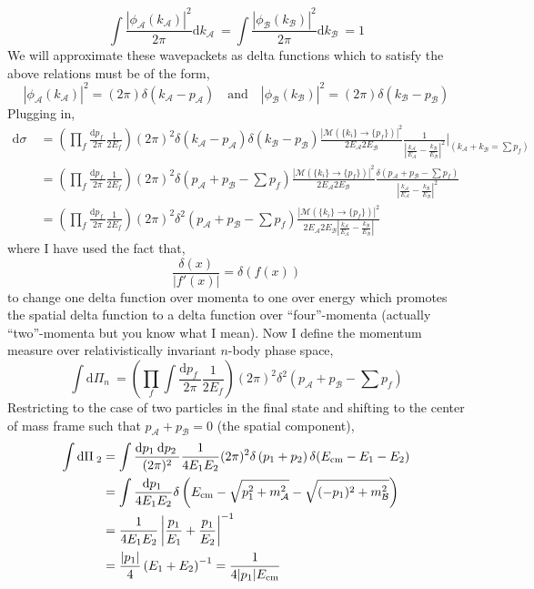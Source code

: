 \documentclass[12pt]{article}
\renewcommand{\d}[1]{ \mathrm{d}#1 \:}
\begin{document}
\[ \int \frac{|\phi_{\mathcal{A}}(k_{\mathcal{A}})|^2}{2\pi} \d{k_{\mathcal{A}}} = \int \frac{|\phi_{\mathcal{B}}(k_{\mathcal{B}})|^2}{2\pi} \d{k_{\mathcal{B}}} = 1 \]
We will approximate these wavepackets as delta functions which to satisfy the above relations must be of the form,
\[ |\phi_{\mathcal{A}}(k_{\mathcal{A}})|^2 = (2 \pi) \delta(k_{\mathcal{A}} - p_{\mathcal{A}}) \quad \text{and} \quad |\phi_{\mathcal{B}}(k_{\mathcal{B}})|^2 = (2 \pi) \delta(k_{\mathcal{B}} - p_{\mathcal{B}}) \]
Plugging in,
\begin{align*}
\d{\sigma} & = \left( \prod_{f} \frac{\d{p_f}}{2 \pi} \frac{1}{2 E_f} \right)  (2 \pi)^2 \delta(k_{\mathcal{A}} - p_{\mathcal{A}}) \delta(k_{\mathcal{B}} - p_{\mathcal{B}}) \frac{| \mathcal{M}(\{ k_i \} \to \{p_f \}) |^2}{ 2 E_\mathcal{A} 2 E_\mathcal{B} } \frac{1}{\left| \frac{k_{\mathcal{A}}}{E_{\mathcal{A}}} - \frac{k_{\mathcal{B}}}{E_{\mathcal{B}}} \right|^2}  \bigg|_{(k_{\mathcal{A}} + k_{\mathcal{B}} = \sum p_f)}
\\
& = \left( \prod_{f} \frac{\d{p_f}}{2 \pi} \frac{1}{2 E_f} \right)  (2 \pi)^2 \delta \left(p_{\mathcal{A}} + p_{\mathcal{B}} - \sum p_f \right) \frac{| \mathcal{M}(\{ k_i \} \to \{p_f \}) |^2}{ 2 E_\mathcal{A} 2 E_\mathcal{B} } \frac{\delta(p_{\mathcal{A}} + p_{\mathcal{B}} - \sum p_f)}{\left| \frac{k_{\mathcal{A}}}{E_{\mathcal{A}}} - \frac{k_{\mathcal{B}}}{E_{\mathcal{B}}} \right|^2} 
\\
& = \left( \prod_{f} \frac{\d{p_f}}{2 \pi} \frac{1}{2 E_f} \right)  (2 \pi)^2 \delta^2 \left(p_{\mathcal{A}} + p_{\mathcal{B}} - \sum p_f \right) \frac{| \mathcal{M}(\{ k_i \} \to \{p_f \}) |^2}{ 2 E_\mathcal{A} 2 E_\mathcal{B} \left| \frac{k_{\mathcal{A}}}{E_{\mathcal{A}}} - \frac{k_{\mathcal{B}}}{E_{\mathcal{B}}} \right| } 
\end{align*}
where I have used the fact that,
\[ \frac{\delta(x)}{|f'(x)|} = \delta(f(x)) \]
to change one delta function over momenta to one over energy which promotes the spatial delta function to a delta function over ``four''-momenta (actually ``two''-momenta but you know what I mean).
Now I define the momentum measure over relativistically invariant $n$-body phase space,
\[ \int \d{\Pi_n} = \left( \prod_{f} \int \frac{\d{p_f}}{2 \pi} \frac{1}{2 E_f} \right)  (2 \pi)^2 \delta^2 \left(p_{\mathcal{A}} + p_{\mathcal{B}} - \sum p_f \right) \]
Restricting to the case of two particles in the final state and shifting to the center of mass frame such that $p_{\mathcal{A}} + p_{\mathcal{B}} = 0$ (the spatial component),
\begin{align*}
\int \d{\Pi}_2 & = \int \frac{\d{p_1} \d{p_2}}{(2 \pi)^2} \frac{1}{4 E_1 E_2} (2 \pi)^2 \delta \left(p_1 + p_2 \right) \delta(\Ecm - E_1 - E_2)
\\
& = \int \frac{\d{p_1}}{4 E_1 E_2} \delta \left(\Ecm - \sqrt{p_1^2 + m_{\mathcal{A}}^2} - \sqrt{(-p_1)^2 + m_{\mathcal{B}}^2} \right)
\\
& = \frac{1}{4 E_1 E_2} \left| \frac{p_1}{E_1} + \frac{p_1}{E_2} \right|^{-1}
\\
& = \frac{|p_1|}{4} \left( E_1 + E_2 \right)^{-1} = \frac{1}{4 |p_1| \Ecm}
\end{align*}
\end{document}

